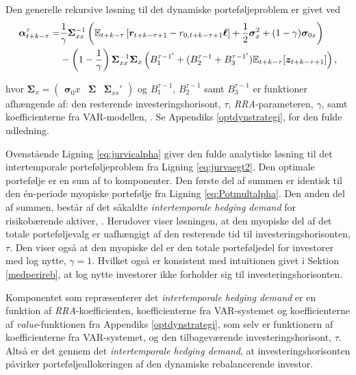 \documentclass[
  a4paper,
  oneside]{memoir}
\begin{document}
Den generelle rekursive løsning til det dynamiske porteføljeproblem er givet ved
\begin{align}
\bm{\alpha}_{t+k-\tau}^\tau = &\frac{1}{\gamma} \bm{\Sigma}_{xx}^{-1} \left( \mathbb{E}_{t+k-\tau} \left[ \bm{r}_{t+k-\tau+1} - r_{0,t+k-\tau+1} \bm{\ell} \right] + \frac{1}{2} \bm{\sigma}_x^2 + (1-\gamma) \bm{\sigma}_{0x} \right) \notag\\
&- \left(1-\frac{1}{\gamma} \right) \bm{\Sigma}_{xx}^{-1} \bm{\Sigma}_x \left(B_1^{\tau-1'}+(B_2^{\tau-1}+B_3^{\tau-1'})\mathbb{E}_{t+k-\tau}[\bm{z}_{t+k-\tau+1}]\right),\label{eq:jurvicalpha}
\end{align}

hvor \(\bm{\Sigma}_x=\begin{pmatrix}\bm{\sigma}_0x & \bm{\Sigma} & \bm{\Sigma}_{xs}'\end{pmatrix}\) og \(B_1^{\tau-1}\), \(B_2^{\tau-1}\) samt \(B_3^{\tau-1}\) er funktioner afhængende af: den resterende investeringshorisont, \(\tau\), \emph{RRA}-parameteren, \(\gamma\), samt koefficienterne fra VAR-modellen, \citep{JurVic2011}. Se Appendiks \ref{optdynstrategi}, for den fulde udledning.

Ovenstående Ligning \eqref{eq:jurvicalpha} giver den fulde analytiske løsning til det intertemporale porteføljeproblem fra Ligning \eqref{eq:jurvaegt2}. Den optimale portefølje er en sum af to komponenter. Den første del af summen er identisk til den én-periode myopiske portefølje fra Ligning \eqref{eq:Potmultalpha}. Den anden del af summen, består af det såkaldte \emph{intertemporale hedging demand} for risikobærende aktiver, \citep{Merton1969, Merton1971, Merton1973}. Herudover viser løsningen, at den myopiske del af det totale porteføljevalg er uafhængigt af den resterende tid til investeringshorisonten, \(\tau\). Den viser også at den myopiske del er den totale porteføljedel for investorer med log nytte, \(\gamma=1\). Hvilket også er konsistent med intuitionen givet i Sektion \ref{medperireb}, at log nytte investorer ikke forholder sig til investeringshorisonten.

Komponentet som repræsenterer det \emph{intertemporale hedging demand} er en funktion af \emph{RRA}-koefficienten, koefficienterne fra VAR-systemet og koefficienterne af \emph{value}-funktionen fra Appendiks \ref{optdynstrategi}, som selv er funktionern af koefficienterne fra VAR-systemet, og den tilbageværende investeringshorisont, \(\tau\). Altså er det gennem det \emph{intertemporale hedging demand}, at investeringshorisonten påvirker porteføljeallokeringen af den dynamiske rebalancerende investor.
\end{document}

